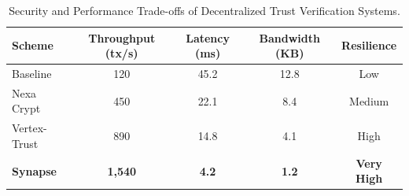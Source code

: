 \begin{table}[t]
  \centering
  \caption{Security and Performance Trade-offs of Decentralized Trust Verification Systems.}
  \label{tab:comparison}
  \begin{tabular}{lcccc}
    \toprule
    \textbf{Scheme} & \textbf{Throughput (tx/s)} & \textbf{Latency (ms)} & \textbf{Bandwidth (KB)} & \textbf{Resilience} \\
    \midrule
    Baseline & 120 & 45.2 & 12.8 & Low \\
    Nexa Crypt & 450 & 22.1 & 8.4 & Medium \\
    Vertex-Trust & 890 & 14.8 & 4.1 & High \\
    \textbf{Synapse} & \textbf{1,540} & \textbf{4.2} & \textbf{1.2} & \textbf{Very High} \\
    \bottomrule
  \end{tabular}
\end{table}
